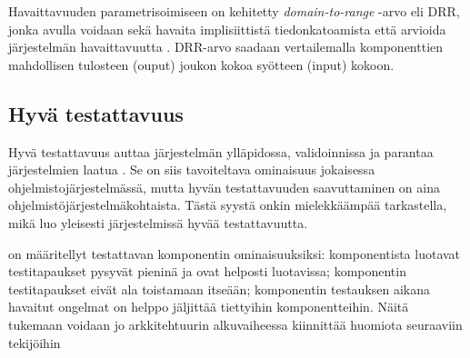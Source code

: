\documentclass[finnish]{tktltiki2}
\theoremstyle{definition}
\theoremstyle{remark}
\begin{document}

Havaittavuuden parametrisoimiseen on kehitetty \textit{domain-to-range} -arvo eli DRR, jonka avulla voidaan sekä havaita implisiittistä tiedonkatoamista \citep[s. 20-22]{Voas:1995:STN:624607.625469} että arvioida järjestelmän havaittavuutta \citep[s. 1]{Jungmayr:2002}. DRR-arvo saadaan vertailemalla komponenttien mahdollisen tulosteen (ouput) joukon kokoa syötteen (input) kokoon.  



\subsection{Hyvä testattavuus}


Hyvä testattavuus auttaa järjestelmän ylläpidossa, validoinnissa ja parantaa järjestelmien laatua \citep[s. 20]{Voas:1995:STN:624607.625469}. Se on siis tavoiteltava ominaisuus jokaisessa ohjelmistojärjestelmässä, mutta hyvän testattavuuden saavuttaminen on aina ohjelmistöjärjestelmäkohtaista. Tästä syystä onkin mielekkäämpää tarkastella, mikä luo yleisesti järjestelmissä hyvää testattavuutta. 





\citep[s. 554]{Freedman:1991:TSC:126218.126229} on määritellyt testattavan komponentin ominaisuuksiksi: komponentista luotavat testitapaukset pysyvät pieninä ja ovat helposti luotavissa; komponentin testitapaukset eivät ala toistamaan itseään; komponentin testauksen aikana havaitut ongelmat on helppo jäljittää tiettyihin komponentteihin. Näitä tukemaan voidaan jo arkkitehtuurin alkuvaiheessa kiinnittää huomiota seuraaviin tekijöihin \citep[s. 117]{voas_improving_1992} 
\end{document}
